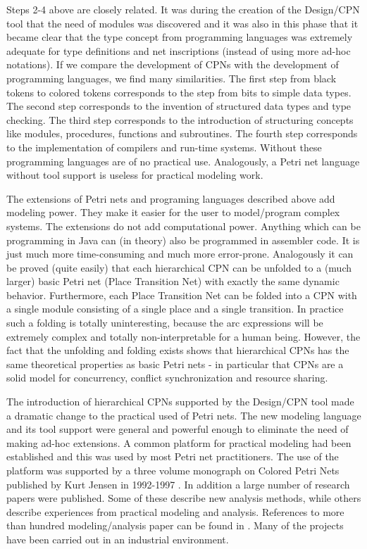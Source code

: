 Steps 2-4 above are closely related. It was during the creation of the
Design/CPN tool that the need of modules was discovered and it was
also in this phase that it became clear that the type concept from
programming languages was extremely adequate for type definitions and
net inscriptions (instead of using more ad-hoc notations). If we
compare the development of CPNs with the development of programming
languages, we find many similarities. The first step from black tokens
to colored tokens corresponds to the step from bits to simple data
types. The second step corresponds to the invention of structured data
types and type checking. The third step corresponds to the
introduction of structuring concepts like modules, procedures,
functions and subroutines. The fourth step corresponds to the
implementation of compilers and run-time systems. Without these
programming languages are of no practical use. Analogously, a Petri
net language without tool support is useless for practical modeling
work.

The extensions of Petri nets and programing languages described above
add modeling power. They make it easier for the user to model/program
complex systems. The extensions do not add computational
power. Anything which can be programming in Java can (in theory) also
be programmed in assembler code. It is just much more time-consuming
and much more error-prone. Analogously it can be proved (quite easily)
that each hierarchical CPN can be unfolded to a (much larger) basic
Petri net (Place Transition Net) with exactly the same dynamic
behavior. Furthermore, each Place Transition Net can be folded into a
CPN with a single module consisting of a single place and a single
transition. In practice such a folding is totally uninteresting,
because the arc expressions will be extremely complex and totally
non-interpretable for a human being. However, the fact that the
unfolding and folding exists shows that hierarchical CPNs has the same
theoretical properties as basic Petri nets - in particular that CPNs
are a solid model for concurrency, conflict synchronization and
resource sharing.

The introduction of hierarchical CPNs supported by the Design/CPN tool
made a dramatic change to the practical used of Petri nets. The new
modeling language and its tool support were general and powerful
enough to eliminate the need of making ad-hoc extensions. A common
platform for practical modeling had been established and this was used
by most Petri net practitioners. The use of the platform was supported
by a three volume monograph on Colored Petri Nets published by Kurt
Jensen in 1992-1997 \cite{jensen:cpnvols}. In addition a large number
of research papers were published. Some of these describe new analysis
methods, while others describe experiences from practical modeling and
analysis. References to more than hundred modeling/analysis paper can
be found in \cite{cpnuse}. Many of the projects have been carried out
in an industrial environment.
 
